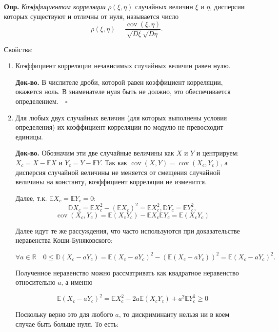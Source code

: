\documentclass[oneside,final,14pt]{extreport}
\newcommand\mydef{{\bf Опр.}}
\newcommand\myqed{{\bf Док-во.}}
\theoremstyle{definition}
\begin{document}
\mydef{} {\it Коэффициентом корреляции} $\rho(\xi,\eta)$ случайных величин $\xi$ и $\eta$, дисперсии которых существуют и отличны от нуля, называется число
$$\rho(\xi, \eta)=\frac{\operatorname{cov}(\xi, \eta)}{\sqrt{D \xi} \sqrt{D \eta}}.$$

Свойства:

\begin{enumerate}
    \item Коэффициент корреляции независимых случайных величин равен нулю.
    
    \myqed{} В числителе дроби, которой равен коэффициент корреляции,
окажется ноль. В знаменателе нуля быть не должно, это обеспечивается определением.
$ ~~~ \square$

    \item Для любых двух случайных величин (для которых выполнены условия определения) их коэффициент корреляции по модулю не превосходит единицы.
    
    \myqed{} Обозначим эти две случайные величины как $X$ и $Y$ и центрируем: $X_c = X - \mathbb{E}X$ и $Y_c = Y - \mathbb{E}Y$. Так как $\operatorname{cov}(X, Y)=\operatorname{cov}\left(X_{c}, Y_{c}\right)$, а дисперсия случайной величины не меняется от смещения случайной величины на константу, коэффициент корреляции не изменится.
    
    Далее, т.к. $\mathbb{E} X_{c}=\mathbb{E} Y_{c}=0$:
    $$\mathbb{D} X_{c}=\mathbb{E} X_{c}^{2}-\left(\mathbb{E} X_{c}\right)^{2}=\mathbb{E} X_{c}^{2}, \mathbb{D} Y_{c}=\mathbb{E} Y_{c}^{2},$$$$ \operatorname{cov}\left(X_{c}, Y_{c}\right)=\mathbb{E}\left(X_{c} Y_{c}\right)-\mathbb{E} X_{c} \mathbb{E} Y_{c}=\mathbb{E}\left(X_{c} Y_{c}\right)$$
    
    Далее идут те же рассуждения, что часто используются при доказательстве неравенства Коши-Буняковского:
    
    $$\forall a \in \mathbb{R} \quad 0 \leqslant \mathbb{D}\left(X_{c}-a Y_{c}\right)=\mathbb{E}\left(X_{c}-a Y_{c}\right)^{2}-\left(\mathbb{E}\left(X_{c}-a Y_{c}\right)\right)^{2}=\mathbb{E}\left(X_{c}-a Y_{c}\right)^{2}.$$
    
    Полученное неравенство можно рассматривать как квадратное неравенство относительно $a$, а именно
    
    $$\mathbb{E}\left(X_{c}-a Y_{c}\right)^{2}=\mathbb{E} X_{c}^{2}-2 a \mathbb{E}\left(X_{c} Y_{c}\right)+a^{2} \mathbb{E} Y_{c}^{2} \geqslant 0$$
    
    Поскольку верно это для любого $a$, то дискриминанту нельзя ни в коем случае быть больше нуля. То есть:
    

\end{enumerate}
\end{document}
